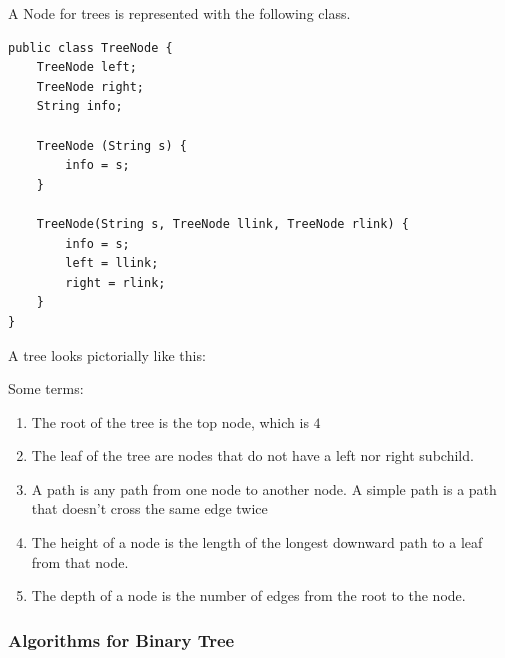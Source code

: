 \documentclass{article}
\theoremstyle{definition}
\theoremstyle{remark}
\theoremstyle{definition}
\begin{document}
A Node for trees is represented with the following class. 
\begin{verbatim}
public class TreeNode {
    TreeNode left; 
    TreeNode right; 
    String info; 
    
    TreeNode (String s) {
        info = s; 
    }
    
    TreeNode(String s, TreeNode llink, TreeNode rlink) {
        info = s; 
        left = llink; 
        right = rlink; 
    }
}
\end{verbatim}

A tree looks pictorially like this: 
\begin{center}
\end{center}
Some terms: 
\begin{enumerate}
    \item The root of the tree is the top node, which is $4$
    \item The leaf of the tree are nodes that do not have a left nor right subchild. 
    \item A path is any path from one node to another node. A simple path is a path that doesn't cross the same edge twice 
    \item The height of a node is the length of the longest downward path to a leaf from that node. 
    \item The depth of a node is the number of edges from the root to the node. 
\end{enumerate}

\subsubsection{Algorithms for Binary Tree}
\end{document}
